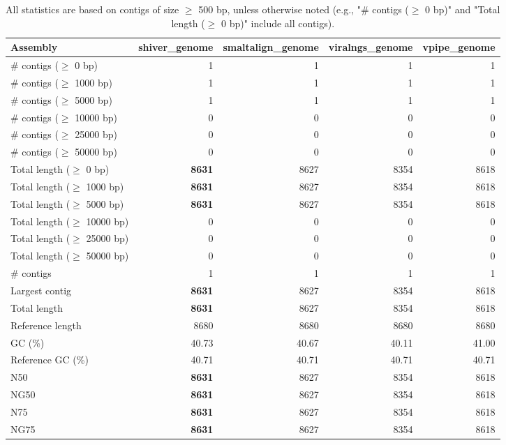\documentclass[12pt,a4paper]{article}
\begin{document}
\begin{table}[ht]
\begin{center}
\caption{All statistics are based on contigs of size $\geq$ 500 bp, unless otherwise noted (e.g., "\# contigs ($\geq$ 0 bp)" and "Total length ($\geq$ 0 bp)" include all contigs).}
\begin{tabular}{|l*{4}{|r}|}
\hline
Assembly & shiver\_genome & smaltalign\_genome & viralngs\_genome & vpipe\_genome \\ \hline
\# contigs ($\geq$ 0 bp) & 1 & 1 & 1 & 1 \\ \hline
\# contigs ($\geq$ 1000 bp) & 1 & 1 & 1 & 1 \\ \hline
\# contigs ($\geq$ 5000 bp) & 1 & 1 & 1 & 1 \\ \hline
\# contigs ($\geq$ 10000 bp) & 0 & 0 & 0 & 0 \\ \hline
\# contigs ($\geq$ 25000 bp) & 0 & 0 & 0 & 0 \\ \hline
\# contigs ($\geq$ 50000 bp) & 0 & 0 & 0 & 0 \\ \hline
Total length ($\geq$ 0 bp) & {\bf 8631} & 8627 & 8354 & 8618 \\ \hline
Total length ($\geq$ 1000 bp) & {\bf 8631} & 8627 & 8354 & 8618 \\ \hline
Total length ($\geq$ 5000 bp) & {\bf 8631} & 8627 & 8354 & 8618 \\ \hline
Total length ($\geq$ 10000 bp) & 0 & 0 & 0 & 0 \\ \hline
Total length ($\geq$ 25000 bp) & 0 & 0 & 0 & 0 \\ \hline
Total length ($\geq$ 50000 bp) & 0 & 0 & 0 & 0 \\ \hline
\# contigs & 1 & 1 & 1 & 1 \\ \hline
Largest contig & {\bf 8631} & 8627 & 8354 & 8618 \\ \hline
Total length & {\bf 8631} & 8627 & 8354 & 8618 \\ \hline
Reference length & 8680 & 8680 & 8680 & 8680 \\ \hline
GC (\%) & 40.73 & 40.67 & 40.11 & 41.00 \\ \hline
Reference GC (\%) & 40.71 & 40.71 & 40.71 & 40.71 \\ \hline
N50 & {\bf 8631} & 8627 & 8354 & 8618 \\ \hline
NG50 & {\bf 8631} & 8627 & 8354 & 8618 \\ \hline
N75 & {\bf 8631} & 8627 & 8354 & 8618 \\ \hline
NG75 & {\bf 8631} & 8627 & 8354 & 8618 \\ \hline

\end{tabular}
\end{center}
\end{table}
\end{document}
